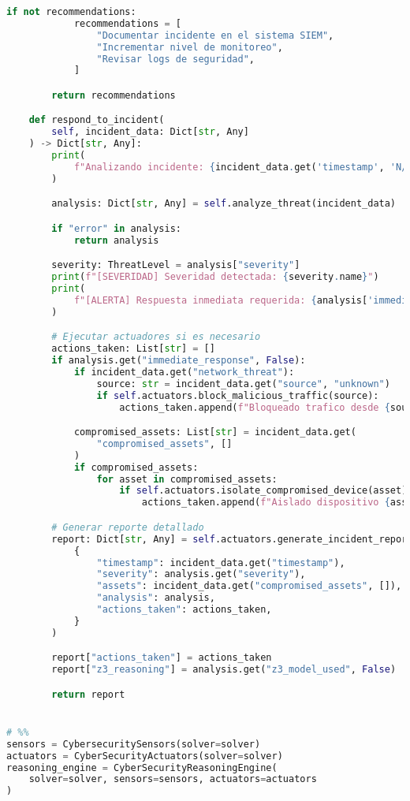 \begin{lstlisting}[language=python, inputencoding=utf8]
        if not recommendations:
            recommendations = [
                "Documentar incidente en el sistema SIEM",
                "Incrementar nivel de monitoreo",
                "Revisar logs de seguridad",
            ]

        return recommendations

    def respond_to_incident(
        self, incident_data: Dict[str, Any]
    ) -> Dict[str, Any]:
        print(
            f"Analizando incidente: {incident_data.get('timestamp', 'N/A')}"
        )

        analysis: Dict[str, Any] = self.analyze_threat(incident_data)

        if "error" in analysis:
            return analysis

        severity: ThreatLevel = analysis["severity"]
        print(f"[SEVERIDAD] Severidad detectada: {severity.name}")
        print(
            f"[ALERTA] Respuesta inmediata requerida: {analysis['immediate_response']}"
        )

        # Ejecutar actuadores si es necesario
        actions_taken: List[str] = []
        if analysis.get("immediate_response", False):
            if incident_data.get("network_threat"):
                source: str = incident_data.get("source", "unknown")
                if self.actuators.block_malicious_traffic(source):
                    actions_taken.append(f"Bloqueado trafico desde {source}")

            compromised_assets: List[str] = incident_data.get(
                "compromised_assets", []
            )
            if compromised_assets:
                for asset in compromised_assets:
                    if self.actuators.isolate_compromised_device(asset):
                        actions_taken.append(f"Aislado dispositivo {asset}")

        # Generar reporte detallado
        report: Dict[str, Any] = self.actuators.generate_incident_report(
            {
                "timestamp": incident_data.get("timestamp"),
                "severity": analysis.get("severity"),
                "assets": incident_data.get("compromised_assets", []),
                "analysis": analysis,
                "actions_taken": actions_taken,
            }
        )

        report["actions_taken"] = actions_taken
        report["z3_reasoning"] = analysis.get("z3_model_used", False)

        return report


# %%
sensors = CybersecuritySensors(solver=solver)
actuators = CyberSecurityActuators(solver=solver)
reasoning_engine = CyberSecurityReasoningEngine(
    solver=solver, sensors=sensors, actuators=actuators
)
\end{lstlisting}